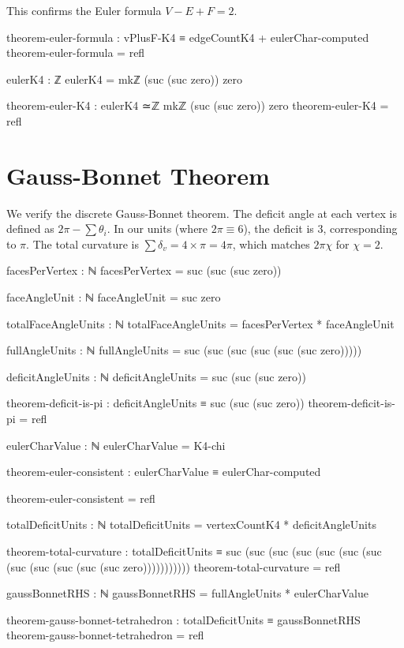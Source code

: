 \documentclass[11pt,a4paper]{book}
\begin{document}
This confirms the Euler formula $V - E + F = 2$.

\begin{code}
theorem-euler-formula : vPlusF-K4 ≡ edgeCountK4 + eulerChar-computed
theorem-euler-formula = refl

eulerK4 : ℤ
eulerK4 = mkℤ (suc (suc zero)) zero

theorem-euler-K4 : eulerK4 ≃ℤ mkℤ (suc (suc zero)) zero
theorem-euler-K4 = refl
\end{code}

\section{Gauss-Bonnet Theorem}

We verify the discrete Gauss-Bonnet theorem. The deficit angle at each vertex is defined as $2\pi - \sum \theta_i$. In our units (where $2\pi \equiv 6$), the deficit is 3, corresponding to $\pi$. The total curvature is $\sum \delta_v = 4 \times \pi = 4\pi$, which matches $2\pi \chi$ for $\chi=2$.

\begin{code}
facesPerVertex : ℕ
facesPerVertex = suc (suc (suc zero))

faceAngleUnit : ℕ
faceAngleUnit = suc zero

totalFaceAngleUnits : ℕ
totalFaceAngleUnits = facesPerVertex * faceAngleUnit

fullAngleUnits : ℕ
fullAngleUnits = suc (suc (suc (suc (suc (suc zero)))))

deficitAngleUnits : ℕ
deficitAngleUnits = suc (suc (suc zero))

theorem-deficit-is-pi : deficitAngleUnits ≡ suc (suc (suc zero))
theorem-deficit-is-pi = refl

eulerCharValue : ℕ
eulerCharValue = K4-chi

theorem-euler-consistent : eulerCharValue ≡ eulerChar-computed
\end{code}
\begin{code}
theorem-euler-consistent = refl

totalDeficitUnits : ℕ
totalDeficitUnits = vertexCountK4 * deficitAngleUnits

theorem-total-curvature : totalDeficitUnits ≡ suc (suc (suc (suc (suc (suc (suc (suc (suc (suc (suc (suc zero)))))))))))
theorem-total-curvature = refl

gaussBonnetRHS : ℕ
gaussBonnetRHS = fullAngleUnits * eulerCharValue

theorem-gauss-bonnet-tetrahedron : totalDeficitUnits ≡ gaussBonnetRHS
theorem-gauss-bonnet-tetrahedron = refl
\end{code}
\end{document}
